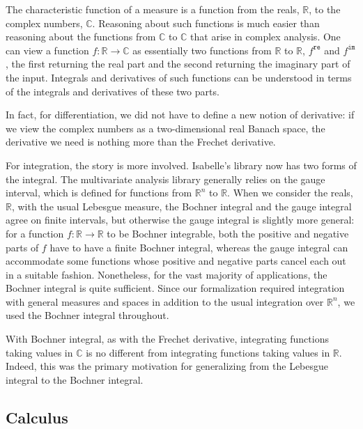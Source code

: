 \documentclass{svjour3}
\newcommand{\RR}{\mathbb{R}}
\newcommand{\CC}{\mathbb{C}}
\newcommand{\fn}[1]{\mathtt{#1}} %
\begin{document}
The characteristic function of a measure is a function from the reals, $\RR$, to the complex numbers, $\CC$. Reasoning about such functions is much easier than reasoning about the functions from $\CC$ to $\CC$ that arise in complex analysis. One can view a function $f : \RR \to \CC$ as essentially two functions from $\RR$ to $\RR$, $f^\fn{re}$ and $f^\fn{im}$, the first returning the real part and the second returning the imaginary part of the input. Integrals and derivatives of such functions can be understood in terms of the integrals and derivatives of these two parts.

In fact, for differentiation, we did not have to define a new notion of derivative: if we view the complex numbers as a two-dimensional real Banach space, the derivative we need is nothing more than the Frechet derivative. 

For integration, the story is more involved. Isabelle's library now has two forms of the integral. The multivariate analysis library generally relies on the gauge interval, which is defined for functions from $\RR^n$ to $\RR$. When we consider the reals, $\RR$, with the usual Lebesgue measure, the Bochner integral and the gauge integral agree on finite intervals, but otherwise the gauge integral is slightly more general: for a function $f : \RR \to \RR$ to be Bochner integrable, both the positive and negative parts of $f$ have to have a finite Bochner integral, whereas the gauge integral can accommodate some functions whose positive and negative parts cancel each out in a suitable fashion. Nonetheless, for the vast majority of applications, the Bochner integral is quite sufficient. Since our formalization required integration with general measures and spaces in addition to the usual integration over $\RR^n$, we used the Bochner integral throughout.

With Bochner integral, as with the Frechet derivative, integrating functions taking values in $\CC$ is no different from integrating functions taking values in $\RR$. Indeed, this was the primary motivation for generalizing from the Lebesgue integral to the Bochner integral.

\subsection{Calculus}
\label{subsection:calculus}
\end{document}

